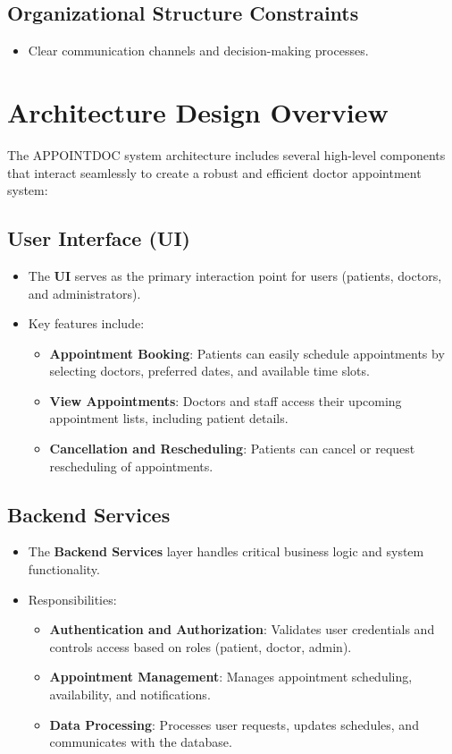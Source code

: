 \documentclass[a4paper, 12pt]{article}
\begin{document}
\subsection{Organizational Structure Constraints}
\begin{itemize}
    \item Clear communication channels and decision-making processes.
\end{itemize}

\section{Architecture Design Overview}
The APPOINTDOC system architecture includes several high-level components that interact seamlessly to create a robust and efficient doctor appointment system:

\subsection{User Interface (UI)}
\begin{itemize}
    \item The \textbf{UI} serves as the primary interaction point for users (patients, doctors, and administrators).
    \item Key features include:
    \begin{itemize}
        \item \textbf{Appointment Booking}: Patients can easily schedule appointments by selecting doctors, preferred dates, and available time slots.
        \item \textbf{View Appointments}: Doctors and staff access their upcoming appointment lists, including patient details.
        \item \textbf{Cancellation and Rescheduling}: Patients can cancel or request rescheduling of appointments.
    \end{itemize}
\end{itemize}

\subsection{Backend Services}
\begin{itemize}
    \item The \textbf{Backend Services} layer handles critical business logic and system functionality.
    \item Responsibilities:
    \begin{itemize}
        \item \textbf{Authentication and Authorization}: Validates user credentials and controls access based on roles (patient, doctor, admin).
        \item \textbf{Appointment Management}: Manages appointment scheduling, availability, and notifications.
        \item \textbf{Data Processing}: Processes user requests, updates schedules, and communicates with the database.
    \end{itemize}
\end{itemize}
\end{document}
